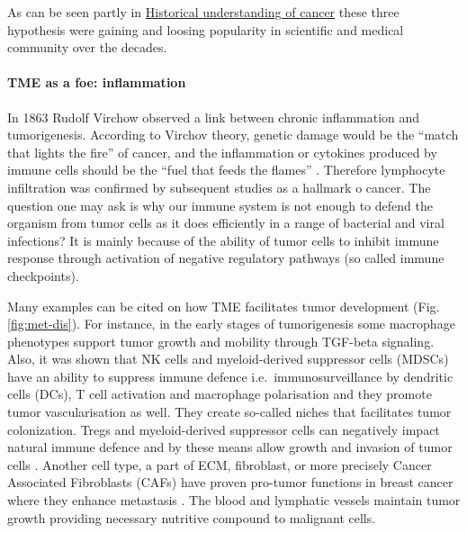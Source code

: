 \documentclass[12pt,]{book}
\let\oldparagraph\paragraph
\renewcommand{\paragraph}[1]{\oldparagraph{#1}\mbox{}}
\theoremstyle{definition}
\theoremstyle{definition}
\theoremstyle{definition}
\theoremstyle{remark}
\begin{document}
As can be seen partly in \protect\hyperlink{hist}{Historical
understanding of cancer} these three hypothesis were gaining and loosing
popularity in scientific and medical community over the decades.

\hypertarget{tme-as-a-foe-inflammation}{%
\paragraph{TME as a foe: inflammation}\label{tme-as-a-foe-inflammation}}

In 1863 Rudolf Virchow observed a link between chronic inflammation and
tumorigenesis. According to Virchov theory, genetic damage would be the
``match that lights the fire'' of cancer, and the inflammation or
cytokines produced by immune cells should be the ``fuel that feeds the
flames'' \citep{Balkwill2001}. Therefore lymphocyte infiltration was
confirmed by subsequent studies as a hallmark o cancer. The question one
may ask is why our immune system is not enough to defend the organism
from tumor cells as it does efficiently in a range of bacterial and
viral infections? It is mainly because of the ability of tumor cells to
inhibit immune response through activation of negative regulatory
pathways (so called immune checkpoints).

Many examples can be cited on how TME facilitates tumor development
(Fig. \ref{fig:met-dis}). For instance, in the early stages of
tumorigenesis some macrophage phenotypes support tumor growth and
mobility through TGF-beta signaling. Also, it was shown that NK cells
and myeloid-derived suppressor cells (MDSCs) have an ability to suppress
immune defence i.e.~immunosurveillance by dendritic cells (DCs), T cell
activation and macrophage polarisation and they promote tumor
vascularisation as well. \citep{Talmadge2013, Gabrilovich2012} They
create so-called niches that facilitates tumor colonization. Tregs and
myeloid-derived suppressor cells can negatively impact natural immune
defence and by these means allow growth and invasion of tumor cells
\citep{Taube2017a}. Another cell type, a part of ECM, fibroblast, or
more precisely Cancer Associated Fibroblasts (CAFs) have proven
pro-tumor functions in breast cancer where they enhance metastasis
\citep{Dumont2013}. The blood and lymphatic vessels maintain tumor
growth providing necessary nutritive compound to malignant cells.
\end{document}
